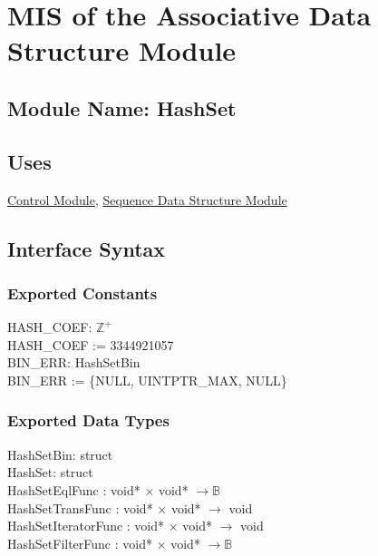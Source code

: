 \documentclass[12pt]{article}
\newcommand{\UZ}{$\mathbb{Z}^+$}
\newcommand{\Control}{\hyperref[MISControl]{Control Module}}
\newcommand{\Sequence}{\hyperref[MISSequence]{Sequence Data Structure Module}}
\begin{document}

\section{MIS of the Associative Data Structure Module} \label{MISAssoc}

\subsection{Module Name: HashSet}

\subsection{Uses} \label{SecUAssoc}
	\Control, \Sequence

\subsection{Interface Syntax}

\subsubsection{Exported Constants} \label{SecECAssoc}
	HASH_COEF: \UZ \\
	HASH_COEF := 3344921057 \\
	\newline
	BIN_ERR: HashSetBin \\
	BIN_ERR := \{NULL, UINTPTR_MAX, NULL\}


\subsubsection{Exported Data Types} \label{SecEDTAssoc}
	HashSetBin: struct \\
	HashSet: struct \\
	HashSetEqlFunc : void* $\times$ void* $\to \mathbb{B}$ \\
	HashSetTransFunc : void* $\times$ void* $\to$ void \\
	HashSetIteratorFunc : void* $\times$ void* $\to$ void \\
	HashSetFilterFunc : void* $\times$ void* $\to \mathbb{B}$
\end{document}

